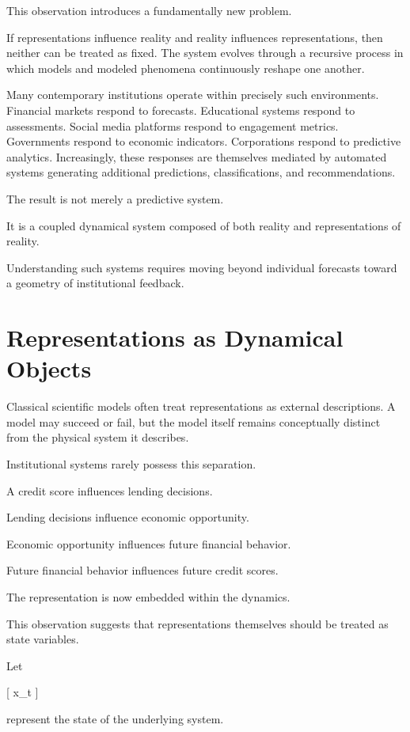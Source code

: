 \documentclass[11pt,oneside,openany]{book}
\begin{document}
This observation introduces a fundamentally new problem.

If representations influence reality and reality influences representations, then neither can be treated as fixed. The system evolves through a recursive process in which models and modeled phenomena continuously reshape one another.

Many contemporary institutions operate within precisely such environments. Financial markets respond to forecasts. Educational systems respond to assessments. Social media platforms respond to engagement metrics. Governments respond to economic indicators. Corporations respond to predictive analytics. Increasingly, these responses are themselves mediated by automated systems generating additional predictions, classifications, and recommendations.

The result is not merely a predictive system.

It is a coupled dynamical system composed of both reality and representations of reality.

Understanding such systems requires moving beyond individual forecasts toward a geometry of institutional feedback.

\section{Representations as Dynamical Objects}

Classical scientific models often treat representations as external descriptions. A model may succeed or fail, but the model itself remains conceptually distinct from the physical system it describes.

Institutional systems rarely possess this separation.

A credit score influences lending decisions.

Lending decisions influence economic opportunity.

Economic opportunity influences future financial behavior.

Future financial behavior influences future credit scores.

The representation is now embedded within the dynamics.

This observation suggests that representations themselves should be treated as state variables.

Let

[
x_t
]

represent the state of the underlying system.
\end{document}

